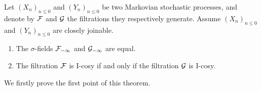 \documentclass[12pt,a4paper]{article}
\begin{document}
\begin{thm}\label{thm:joinable}
Let ${(X_n)}_{n \leq 0}$ and ${(Y_n)}_{n \leq 0}$ be two Markovian stochastic processes, and 
denote by $\mathcal{F}$ and $\mathcal{G}$ the filtrations they respectively generate. 
Assume ${(X_n)}_{n \leq 0}$ and ${(Y_n)}_{n \leq 0}$ are closely joinable. 
\begin{enumerate}
\item The $\sigma$-fields $\mathcal{F}_{-\infty}$  and $\mathcal{G}_{-\infty}$ are equal. 

\item The filtration $\mathcal{F}$ is I-cosy if and only if the filtration $\mathcal{G}$ is I-cosy.
\end{enumerate}
\end{thm}

We firstly prove the first point of this theorem. 
\end{document}
